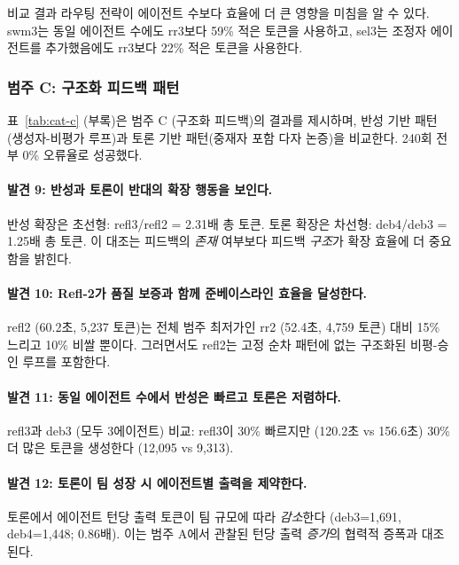 \documentclass[a4paper,11pt]{article}
\begin{document}

비교 결과 라우팅 전략이 에이전트 수보다 효율에 더 큰 영향을 미침을 알 수 있다. swm3는 동일 에이전트 수에도 rr3보다 59\% 적은 토큰을 사용하고, sel3는 조정자 에이전트를 추가했음에도 rr3보다 22\% 적은 토큰을 사용한다.

\subsubsection{범주 C: 구조화 피드백 패턴}

표~\ref{tab:cat-c} (부록)은 범주 C (구조화 피드백)의 결과를 제시하며, 반성 기반 패턴(생성자-비평가 루프)과 토론 기반 패턴(중재자 포함 다자 논증)을 비교한다. 240회 전부 0\% 오류율로 성공했다.


\paragraph{발견 9: 반성과 토론이 반대의 확장 행동을 보인다.}
반성 확장은 초선형: refl3/refl2 = 2.31배 총 토큰. 토론 확장은 차선형: deb4/deb3 = 1.25배 총 토큰. 이 대조는 피드백의 \emph{존재} 여부보다 피드백 \emph{구조}가 확장 효율에 더 중요함을 밝힌다.

\paragraph{발견 10: Refl-2가 품질 보증과 함께 준베이스라인 효율을 달성한다.}
refl2 (60.2초, 5,237 토큰)는 전체 범주 최저가인 rr2 (52.4초, 4,759 토큰) 대비 15\% 느리고 10\% 비쌀 뿐이다. 그러면서도 refl2는 고정 순차 패턴에 없는 구조화된 비평-승인 루프를 포함한다.

\paragraph{발견 11: 동일 에이전트 수에서 반성은 빠르고 토론은 저렴하다.}
refl3과 deb3 (모두 3에이전트) 비교: refl3이 30\% 빠르지만 (120.2초 vs 156.6초) 30\% 더 많은 토큰을 생성한다 (12,095 vs 9,313).

\paragraph{발견 12: 토론이 팀 성장 시 에이전트별 출력을 제약한다.}
토론에서 에이전트 턴당 출력 토큰이 팀 규모에 따라 \emph{감소}한다 (deb3=1,691, deb4=1,448; 0.86배). 이는 범주 A에서 관찰된 턴당 출력 \emph{증가}의 협력적 증폭과 대조된다.
\end{document}
